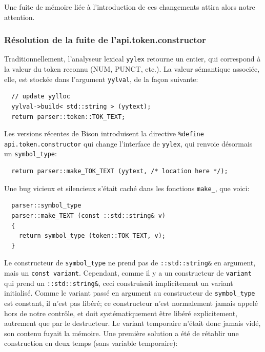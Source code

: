 \documentclass[a4paper,11pt,twoside,final]{article}
\begin{document}
  Une fuite de mémoire liée à l'introduction de ces changements attira alors
  notre attention.

  \subsubsection{Résolution de la fuite de l'api.token.constructor}

  Traditionnellement, l'analyseur lexical \texttt{yylex} retourne un entier,
  qui correspond à la valeur du token reconnu (NUM, PUNCT, etc.). La valeur
  sémantique associée, elle, est stockée dans l'argument \texttt{yylval}, de la
  façon suivante:

  \begin{verbatim}
  // update yylloc
  yylval->build< std::string > (yytext);
  return parser::token::TOK_TEXT;
  \end{verbatim}

  Les versions récentes de Bison introduisent la directive \texttt{\%define
  api.token.constructor} qui change l'interface de \texttt{yylex}, qui renvoie
  désormais un \texttt{symbol\_type}:

  \begin{verbatim}
  return parser::make_TOK_TEXT (yytext, /* location here */);
  \end{verbatim}

  Une bug vicieux et silencieux s'était caché dans les fonctions
  \texttt{make\_}, que voici:

  \begin{verbatim}
  parser::symbol_type
  parser::make_TEXT (const ::std::string& v)
  {
    return symbol_type (token::TOK_TEXT, v);
  }
  \end{verbatim}

  Le constructeur de \texttt{symbol\_type} ne prend pas de
  \texttt{::std::string\&} en argument, mais un \texttt{const variant}.
  Cependant, comme il y a un constructeur de \texttt{variant} qui prend un
  \texttt{::std::string\&}, ceci construisait implicitement un variant
  initialisé. Comme le variant passé en argument au constructeur de
  \texttt{symbol\_type} est constant, il n'est pas libéré; ce constructeur
  n'est normalement jamais appelé hors de notre contrôle, et doit
  systématiquement être libéré explicitement, autrement que par le destructeur.
  Le variant temporaire n'était donc jamais vidé, son contenu fuyait la
  mémoire. Une première solution a été de rétablir une construction en deux
  temps (sans variable temporaire):
\end{document}
